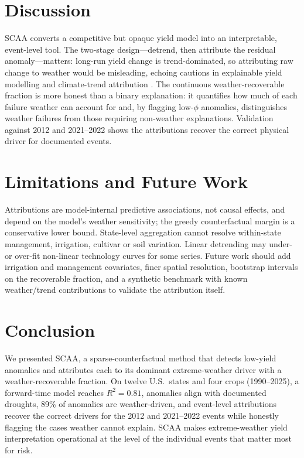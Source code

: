 \documentclass[11pt]{article}
\begin{document}
\section{Discussion}
\label{sec:discussion}
SCAA converts a competitive but opaque yield model into an interpretable, event-level
tool. The two-stage design---detrend, then attribute the residual anomaly---matters: long-run
yield change is trend-dominated, so attributing raw change to weather would be
misleading, echoing cautions in explainable yield modelling \citep{Hu2023ExplainableYield}
and climate-trend attribution \citep{Lobell2011ClimateTrends}. The continuous
weather-recoverable fraction is more honest than a binary explanation: it quantifies how
much of each failure weather can account for and, by flagging low-$\phi$ anomalies,
distinguishes weather failures from those requiring non-weather explanations. Validation
against 2012 and 2021--2022 shows the attributions recover the correct physical driver for
documented events.

\section{Limitations and Future Work}
\label{sec:limits}
Attributions are model-internal predictive associations, not causal effects, and depend
on the model's weather sensitivity; the greedy counterfactual margin is a conservative
lower bound. State-level aggregation cannot resolve within-state management, irrigation,
cultivar or soil variation. Linear detrending may under- or over-fit non-linear technology
curves for some series. Future work should add irrigation and management covariates,
finer spatial resolution, bootstrap intervals on the recoverable fraction, and a synthetic
benchmark with known weather/trend contributions to validate the attribution itself.

\section{Conclusion}
\label{sec:conclusion}
We presented SCAA, a sparse-counterfactual method that detects low-yield anomalies and
attributes each to its dominant extreme-weather driver with a weather-recoverable
fraction. On twelve U.S.\ states and four crops (1990--2025), a forward-time model reaches
$R^2=0.81$, anomalies align with documented droughts, 89\% of anomalies are weather-driven,
and event-level attributions recover the correct drivers for the 2012 and 2021--2022
events while honestly flagging the cases weather cannot explain. SCAA makes
extreme-weather yield interpretation operational at the level of the individual events
that matter most for risk.

\small


\end{document}
